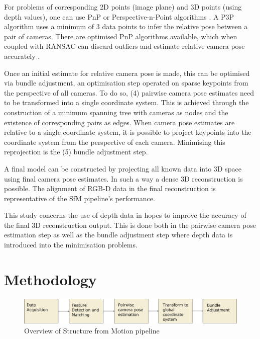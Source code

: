 \documentclass[10pt,twocolumn,letterpaper]{article}
\begin{document}
For problems of corresponding 2D points (image plane) and 3D points (using depth
values), one can use PnP or Perspective-n-Point algorithms \cite{d2013p3p}. A P3P
algorithm uses a minimum of 3 data points to infer the relative pose between a
pair of cameras. There are optimised PnP algorithms available, which when
coupled with RANSAC can discard outliers and estimate relative camera pose
accurately \cite{lepetit2009epnp}.

Once an initial estimate for relative camera pose is made, this can be optimised
via bundle adjustment, an optimisation step operated on sparse keypoints from
the perspective of all cameras. To do so, (4) pairwise camera pose estimates
need to be transformed into a single coordinate system. This is achieved through
the construction of a minimum spanning tree with cameras as nodes and the
existence of corresponding pairs as edges. When camera pose estimates are
relative to a single coordinate system, it is possible to project keypoints into
the coordinate system from the perspective of each camera. Minimising this
reprojection is the (5) bundle adjustment step.

A final model can be constructed by projecting all known data into 3D space
using final camera pose estimates. In such a way a dense 3D reconstruction is
possible. The alignment of RGB-D data in the final reconstruction is
representative of the SfM pipeline's performance.

This study concerns the use of depth data in hopes to improve the accuracy of
the final 3D reconstruction output. This is done both in the pairwise camera
pose estimation step as well as the bundle adjustment step where depth data
is introduced into the minimisation problems.



\section{Methodology}

\begin{figure}[ht]
\begin{center}
   \includegraphics[width=0.9\linewidth]{figures/pipeline.pdf}
\end{center}
\caption{Overview of Structure from Motion pipeline}
\label{fig:pipeline}
\end{figure}
\end{document}
